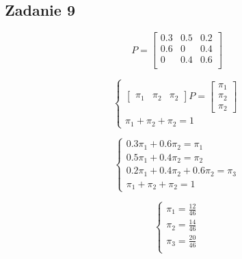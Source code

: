 \subsection{Zadanie 9}

$$
P = 
\begin{bmatrix}
    0.3 & 0.5 & 0.2 \\
    0.6 & 0 & 0.4 \\
    0 & 0.4 & 0.6 \\
\end{bmatrix}
$$

$$
\begin{cases}
\begin{bmatrix}
    \pi_{1} & \pi_{2} & \pi_{2}
\end{bmatrix}
P = 
\begin{bmatrix}
    \pi_{1} \\
    \pi_{2} \\
    \pi_{2}
\end{bmatrix} \\
\pi_{1} + \pi_{2} + \pi_{2} = 1
\end{cases}
$$

$$
\begin{cases}
0.3\pi_{1} + 0.6\pi_{2}  = \pi_{1} \\
0.5\pi_{1} + 0.4\pi_{2} = \pi_{2} \\
0.2\pi_{1} + 0.4\pi_{2} + 0.6\pi_{2} = \pi_{3} \\
\pi_{1} + \pi_{2} + \pi_{2} = 1
\end{cases}
$$

$$
\begin{cases}
\pi_{1} = \frac{12}{46} \\
\pi_{2} = \frac{14}{46} \\
\pi_{3} = \frac{20}{46} \\
\end{cases}
$$
